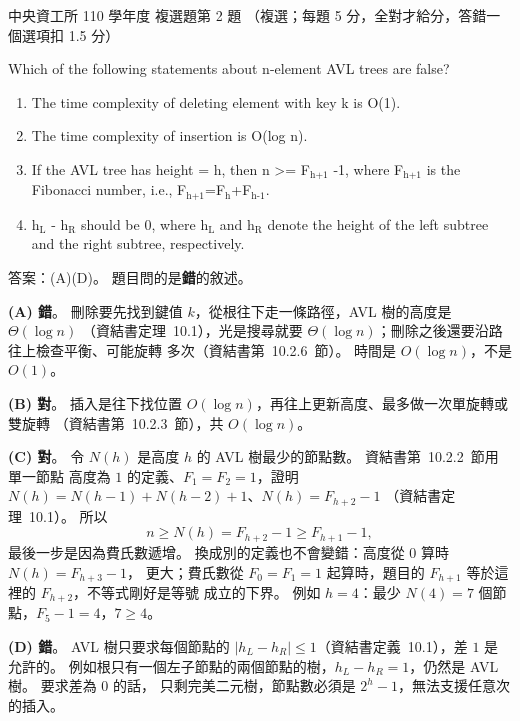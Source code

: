 \begin{pastexam}[label={px:ncu-110-dsa-02}]{中央資工所 110 學年度 複選題第 2 題}
（複選；每題 5 分，全對才給分，答錯一個選項扣 1.5 分）

Which of the following statements about n-element AVL trees are false?
\begin{enumerate}[label=(\Alph*)]
\item The time complexity of deleting element with key k is O(1).
\item The time complexity of insertion is O(log n).
\item If the AVL tree has height = h, then n >= F$_{\text{h+1}}$ -1, where F$_{\text{h+1}}$ is the
Fibonacci number, i.e., F$_{\text{h+1}}$=F$_{\text{h}}$+F$_{\text{h-1}}$.
\item h$_{\text{L}}$ - h$_{\text{R}}$ should be 0, where h$_{\text{L}}$ and h$_{\text{R}}$ denote
the height of the left subtree and the right subtree, respectively.
\end{enumerate}
\end{pastexam}

\begin{pastsoln}
答案：(A)(D)。 題目問的是\textbf{錯}的敘述。

\textbf{(A) 錯}。 刪除要先找到鍵值 $k$，從根往下走一條路徑，AVL 樹的高度是 $\Theta(\log n)$
（資結書定理~10.1），光是搜尋就要 $\Theta(\log n)$；刪除之後還要沿路往上檢查平衡、可能旋轉
多次（資結書第~10.2.6~節）。 時間是 $O(\log n)$，不是 $O(1)$。

\textbf{(B) 對}。 插入是往下找位置 $O(\log n)$，再往上更新高度、最多做一次單旋轉或雙旋轉
（資結書第~10.2.3~節），共 $O(\log n)$。

\textbf{(C) 對}。 令 $N(h)$ 是高度 $h$ 的 AVL 樹最少的節點數。 資結書第~10.2.2~節用單一節點
高度為 $1$ 的定義、$F_1 = F_2 = 1$，證明 $N(h) = N(h-1) + N(h-2) + 1$、$N(h) = F_{h+2} - 1$
（資結書定理~10.1）。 所以
\[
n \ge N(h) = F_{h+2} - 1 \ge F_{h+1} - 1,
\]
最後一步是因為費氏數遞增。 換成別的定義也不會變錯：高度從 $0$ 算時 $N(h) = F_{h+3} - 1$，
更大；費氏數從 $F_0 = F_1 = 1$ 起算時，題目的 $F_{h+1}$ 等於這裡的 $F_{h+2}$，不等式剛好是等號
成立的下界。 例如 $h = 4$：最少 $N(4) = 7$ 個節點，$F_5 - 1 = 4$，$7 \ge 4$。

\textbf{(D) 錯}。 AVL 樹只要求每個節點的 $|h_L - h_R| \le 1$（資結書定義~10.1），差 $1$ 是允許的。
例如根只有一個左子節點的兩個節點的樹，$h_L - h_R = 1$，仍然是 AVL 樹。 要求差為 $0$ 的話，
只剩完美二元樹，節點數必須是 $2^h - 1$，無法支援任意次的插入。
\end{pastsoln}

